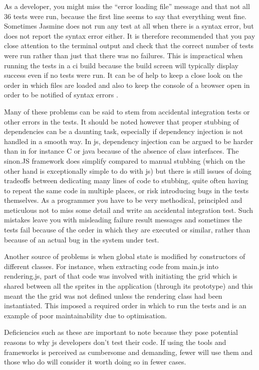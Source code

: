 \documentclass[11pt]{article}
\begin{document}
As a developer, you might miss the ``error loading file'' message and that not all 36 tests were run, because the first line seems to say that everything went fine. Sometimes Jasmine does not run any test at all when there is a syntax error, but does not report the syntax error either. It is therefore recommended that you pay close attention to the terminal output and check that the correct number of tests were run rather than just that there was no failures. This is impractical when running the tests in a \gls{ci} build because the build screen will typically display success even if no tests were run. It can be of help to keep a close look on the order in which files are loaded and also to keep the console of a browser open in order to be notified of syntax errors \cite{MikeJansen}.

Many of these problems can be said to stem from accidental integration tests or other errors in the tests. It should be noted however that proper stubbing of dependencies can be a daunting task, especially if dependency injection is not handled in a smooth way. In \gls{js}, dependency injection can be argued to be harder than in for instance C or java because of the absence of class interfaces. The sinon.JS framework does simplify compared to manual stubbing (which on the other hand is exceptionally simple to do with \gls{js}) but there is still issues of doing tradeoffs between dedicating many lines of code to stubbing, quite often having to repeat the same code in multiple places, or risk introducing bugs in the tests themselves. As a programmer you have to be very methodical, principled and meticulous not to miss some detail and write an accidental integration test. Such mistakes leave you with misleading failure result messages and sometimes the tests fail because of the order in which they are executed or similar, rather than because of an actual bug in the system under test.

Another source of problems is when global state is modified by constructors of different classes. For instance, when extracting code from main.js into rendering.js, part of that code was involved with initiating the grid which is shared between all the sprites in the application (through its prototype) and this meant the the grid was not defined unless the rendering class had been instantiated. This imposed a required order in which to run the tests and is an example of poor maintainability due to optimisation.

Deficiencies such as these are important to note because they pose potential reasons to why \gls{js} developers don't test their code. If using the tools and frameworks is perceived as cumbersome and demanding, fewer will use them and those who do will consider it worth doing so in fewer cases.
\end{document}
